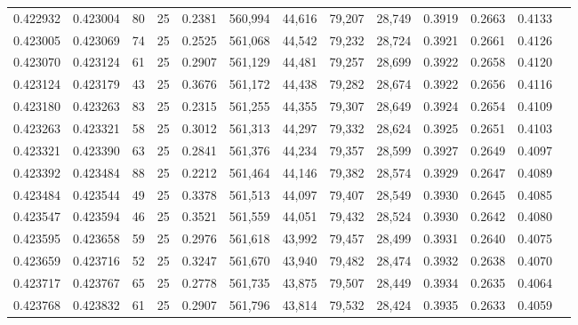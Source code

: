 \begin{tabular}{rrrrrrrrrrrrr}
0.422932 & 0.423004 &    80 &  25 &                                     0.2381 & 560,994 &  44,616 &  79,207 &  28,749 & 0.3919 & 0.2663 & 0.4133 \\
0.423005 & 0.423069 &    74 &  25 &                                     0.2525 & 561,068 &  44,542 &  79,232 &  28,724 & 0.3921 & 0.2661 & 0.4126 \\
0.423070 & 0.423124 &    61 &  25 &                                     0.2907 & 561,129 &  44,481 &  79,257 &  28,699 & 0.3922 & 0.2658 & 0.4120 \\
0.423124 & 0.423179 &    43 &  25 &                                     0.3676 & 561,172 &  44,438 &  79,282 &  28,674 & 0.3922 & 0.2656 & 0.4116 \\
0.423180 & 0.423263 &    83 &  25 &                                     0.2315 & 561,255 &  44,355 &  79,307 &  28,649 & 0.3924 & 0.2654 & 0.4109 \\
0.423263 & 0.423321 &    58 &  25 &                                     0.3012 & 561,313 &  44,297 &  79,332 &  28,624 & 0.3925 & 0.2651 & 0.4103 \\
0.423321 & 0.423390 &    63 &  25 &                                     0.2841 & 561,376 &  44,234 &  79,357 &  28,599 & 0.3927 & 0.2649 & 0.4097 \\
0.423392 & 0.423484 &    88 &  25 &                                     0.2212 & 561,464 &  44,146 &  79,382 &  28,574 & 0.3929 & 0.2647 & 0.4089 \\
0.423484 & 0.423544 &    49 &  25 &                                     0.3378 & 561,513 &  44,097 &  79,407 &  28,549 & 0.3930 & 0.2645 & 0.4085 \\
0.423547 & 0.423594 &    46 &  25 &                                     0.3521 & 561,559 &  44,051 &  79,432 &  28,524 & 0.3930 & 0.2642 & 0.4080 \\
0.423595 & 0.423658 &    59 &  25 &                                     0.2976 & 561,618 &  43,992 &  79,457 &  28,499 & 0.3931 & 0.2640 & 0.4075 \\
0.423659 & 0.423716 &    52 &  25 &                                     0.3247 & 561,670 &  43,940 &  79,482 &  28,474 & 0.3932 & 0.2638 & 0.4070 \\
0.423717 & 0.423767 &    65 &  25 &                                     0.2778 & 561,735 &  43,875 &  79,507 &  28,449 & 0.3934 & 0.2635 & 0.4064 \\
0.423768 & 0.423832 &    61 &  25 &                                     0.2907 & 561,796 &  43,814 &  79,532 &  28,424 & 0.3935 & 0.2633 & 0.4059 \\

\end{tabular}
